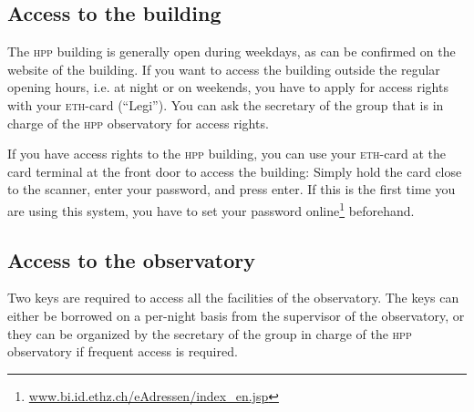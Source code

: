\documentclass[a4paper, 11pt, fleqn]{memoir}
\begin{document}
\subsection{Access to the building}
The \textsc{hpp} building is generally open during weekdays, as can be confirmed on the website of the building.
If you want to access the building outside the regular opening hours, i.e. at night or on weekends, you have to apply for access rights with your \textsc{eth}-card (\enquote{Legi}).
You can ask the secretary of the group that is in charge of the \textsc{hpp} observatory for access rights.

If you have access rights to the \textsc{hpp} building, you can use your \textsc{eth}-card at the card terminal at the front door to access the building: Simply hold the card close to the scanner, enter your password, and press enter.
If this is the first time you are using this system, you have to set your password online\footnote{\url{www.bi.id.ethz.ch/eAdressen/index_en.jsp}} beforehand.

\subsection{Access to the observatory}
Two keys are required to access all the facilities of the observatory.
The keys can either be borrowed on a per-night basis from the supervisor of the observatory, or they can be organized by the secretary of the group in charge of the \textsc{hpp} observatory if frequent access is required.

\printbibliography
\end{document}
